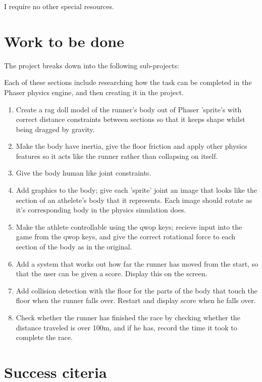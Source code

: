 \documentclass[12pt,a4paper,twoside]{article}
\begin{document}
I require no other special resources.

\section*{Work to be done}


The project breaks down into the following sub-projects:

Each of these sections include researching how the task can be completed in the Phaser physics engine, and then creating it in the project.

\begin{enumerate}
\item Create a rag doll model of the runner's body out of Phaser 'sprite's with correct distance constraints between sections so that it keeps shape whilst being dragged by gravity.
\item Make the body have inertia, give the floor friction and apply other physics features so it acts like the runner rather than collapsing on itself.
\item Give the body human like joint constraints.
\item Add graphics to the body; give each 'sprite' joint an image that looks like the section of an athelete's body that it represents. Each image should rotate as it's corresponding body in the physics simulation does.
\item Make the athlete controllable using the qwop keys; recieve input into the game from the qwop keys, and give the correct rotational force to each section of the body as in the original.
\item Add a system that works out how far the runner has moved from the start, so that the user can be given a score. Display this on the screen.
\item Add collision detection with the floor for the parts of the body that touch the floor when the runner falls over. Restart and display score when he falls over.
\item Check whether the runner has finished the race by checking whether the distance traveled is over 100m, and if he has, record the time it took to complete the race.
\end{enumerate}

\section*{Success citeria}
\end{document}
